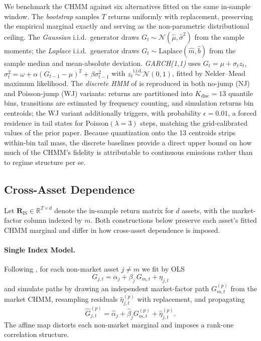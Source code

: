We benchmark the CHMM against six alternatives fitted on the same in-sample window.
The \textit{bootstrap} samples $T$ returns uniformly with replacement, preserving the empirical marginal exactly and serving as the non-parametric distributional ceiling.
The \textit{Gaussian} i.i.d.\ generator draws $G_t \sim \mathcal{N}(\hat\mu, \hat\sigma^2)$ from the sample moments; the \textit{Laplace} i.i.d.\ generator draws $G_t \sim \text{Laplace}(\hat m, \hat b)$ from the sample median and mean-absolute deviation.
\textit{GARCH(1,1)} \cite{bollerslev1986generalized} uses $G_t = \mu + \sigma_t z_t$, $\sigma_t^2 = \omega + \alpha(G_{t-1} - \mu)^2 + \beta \sigma_{t-1}^2$ with $z_t \overset{\text{i.i.d.}}{\sim} \mathcal{N}(0, 1)$, fitted by Nelder--Mead maximum likelihood.
\label{sec:discrete_hmm}%
The \textit{discrete HMM} of \citet{alswaidan2026hybrid} is reproduced in both no-jump (NJ) and Poisson-jump (WJ) variants: returns are partitioned into $K_{\text{disc}} = 13$ quantile bins, transitions are estimated by frequency counting, and simulation returns bin centroids; the WJ variant additionally triggers, with probability $\epsilon = 0.01$, a forced residence in tail states for Poisson$(\lambda = 3)$ steps, matching the grid-calibrated values of the prior paper.
Because quantization onto the 13 centroids strips within-bin tail mass, the discrete baselines provide a direct upper bound on how much of the CHMM's fidelity is attributable to continuous emissions rather than to regime structure per se.

\subsection{Cross-Asset Dependence}
\label{sec:cross_asset_methods}

Let $\mathbf{R}_{\text{IS}} \in \mathbb{R}^{T \times d}$ denote the in-sample return matrix for $d$ assets, with the market-factor column indexed by $m$.
Both constructions below preserve each asset's fitted CHMM marginal and differ in how cross-asset dependence is imposed.

\paragraph{Single Index Model.}
Following \citet{sharpe1963simplified}, for each non-market asset $j \neq m$ we fit by OLS
\begin{equation}
    G_{j,t} = \alpha_j + \beta_j\, G_{m,t} + \eta_{j,t}
    \label{eq:sim}
\end{equation}
and simulate paths by drawing an independent market-factor path $G_{m,t}^{(p)}$ from the market CHMM, resampling residuals $\hat{\eta}_{j,t}^{(p)}$ with replacement, and propagating
\begin{equation}
    \hat{G}_{j,t}^{(p)} = \hat\alpha_j + \hat\beta_j G_{m,t}^{(p)} + \hat\eta_{j,t}^{(p)}.
    \label{eq:sim_sim}
\end{equation}
The affine map distorts each non-market marginal and imposes a rank-one correlation structure.


